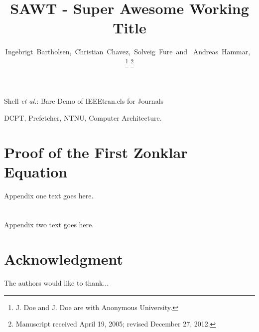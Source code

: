 \documentclass[journal]{IEEEtran}
\begin{document}
\title{SAWT - Super Awesome Working Title}

\author{Ingebrigt~Bartholsen,~Christian~Chavez,~Solveig~Fure~and ~Andreas~Hammar,~


\thanks{J. Doe and J. Doe are with Anonymous University.}
\thanks{Manuscript received April 19, 2005; revised December 27, 2012.}}

%
{Shell \MakeLowercase{\textit{et al.}}: Bare Demo of IEEEtran.cls for Journals}


\maketitle



\begin{IEEEkeywords}
DCPT, Prefetcher, NTNU, Computer Architecture.
\end{IEEEkeywords}
\IEEEpeerreviewmaketitle

















\appendices
\section{Proof of the First Zonklar Equation}
Appendix one text goes here.

\section{}
Appendix two text goes here.


\section*{Acknowledgment}

The authors would like to thank...

\ifCLASSOPTIONcaptionsoff
  \newpage
\fi

\end{document}
